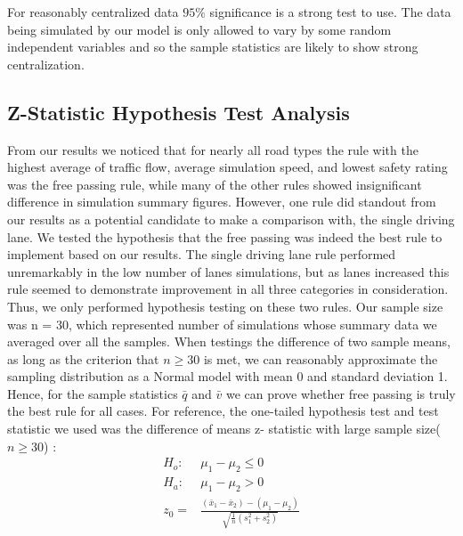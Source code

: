 \documentclass{amsart}
\begin{document}
		For reasonably centralized data $95\% $ significance is a strong test to use. The data being simulated by our model is only allowed to vary by some random independent variables and so the sample statistics are likely to show strong centralization. 	
		
	\subsection{Z-Statistic Hypothesis Test Analysis}
	From our results we noticed that for nearly all road types the rule with the highest average of traffic flow, average simulation speed, and lowest safety rating was the free passing rule, while many of the other rules showed insignificant difference in simulation summary figures. However, one rule did standout from our results as a potential candidate to make a comparison with, the single driving lane. We tested the hypothesis that the free passing was indeed the best rule to implement based on our results. The single driving lane rule performed unremarkably in the low number of lanes simulations, but as lanes increased this rule seemed to demonstrate improvement in all three categories in consideration. Thus, we only performed hypothesis testing on these two rules. Our sample size was n = 30, which represented number of simulations whose summary data we averaged over all the samples. When testings the difference of two sample means, as long as the criterion that $n \geq 30$ is met, we can  reasonably approximate the sampling distribution as a Normal model with mean 0 and standard deviation 1. Hence, for the sample statistics $\bar q$ and $\bar v$ we can prove whether free passing is truly the best rule for all cases. For reference, the one-tailed hypothesis test and test statistic we used was the difference of means z- statistic with large sample size($n\geq30$) \cite{FundTrafficEng}: 	
	\begin{align*}
		H_o : &\mu_1 - \mu_2 \leq 0\\
		H_a : &\mu_1 - \mu_2 >0\\
		z_0 = &\frac{(\bar x_1 - \bar x_2) - (\mu_1 - \mu_2)}{\sqrt{\frac{1}{n}(s_1^2 + s_2^2)}}
	\end{align*}
	
\end{document}
